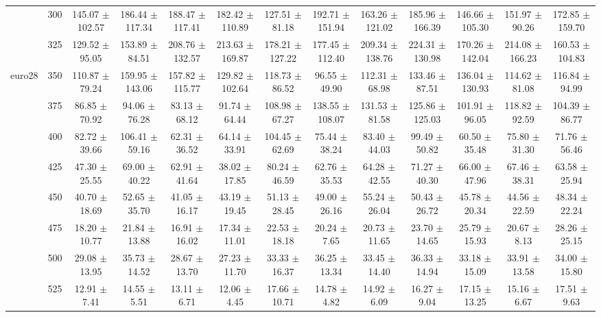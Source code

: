 \begin{table}[h]
{\begin{tabular}{
        ccccccccccccc}
 & 300& 145.07 $\pm$ 102.57& 186.44 $\pm$ 117.34& 188.47 $\pm$ 117.41& 182.42 $\pm$ 110.89& 127.51 $\pm$ 81.18& 192.71 $\pm$ 151.94& 163.26 $\pm$ 121.02& 185.96 $\pm$ 166.39& 146.66 $\pm$ 105.30& 151.97 $\pm$ 90.26& 172.85 $\pm$ 159.70 \\ 
 & 325& 129.52 $\pm$ 95.05& 153.89 $\pm$ 84.51& 208.76 $\pm$ 132.57& 213.63 $\pm$ 169.87& 178.21 $\pm$ 127.22& 177.45 $\pm$ 112.40& 209.34 $\pm$ 138.76& 224.31 $\pm$ 130.98& 170.26 $\pm$ 142.04& 214.08 $\pm$ 166.23& 160.53 $\pm$ 104.83 \\ 
\multirow{4}{*}{euro28}& 350& 110.87 $\pm$ 79.24& 159.95 $\pm$ 143.06& 157.82 $\pm$ 115.77& 129.82 $\pm$ 102.64& 118.73 $\pm$ 86.52& 96.55 $\pm$ 49.90& 112.31 $\pm$ 68.98& 133.46 $\pm$ 87.51& 136.04 $\pm$ 130.93& 114.62 $\pm$ 81.08& 116.84 $\pm$ 94.99 \\ 
 & 375& 86.85 $\pm$ 70.92& 94.06 $\pm$ 76.28& 83.13 $\pm$ 68.12& 91.74 $\pm$ 64.44& 108.98 $\pm$ 67.27& 138.55 $\pm$ 108.07& 131.53 $\pm$ 81.58& 125.86 $\pm$ 125.03& 101.91 $\pm$ 96.05& 118.82 $\pm$ 92.59& 104.39 $\pm$ 86.77 \\ 
 & 400& 82.72 $\pm$ 39.66& 106.41 $\pm$ 59.16& 62.31 $\pm$ 36.52& 64.14 $\pm$ 33.91& 104.45 $\pm$ 62.69& 75.44 $\pm$ 38.24& 83.40 $\pm$ 44.03& 99.49 $\pm$ 50.82& 60.50 $\pm$ 35.48& 75.80 $\pm$ 31.30& 71.76 $\pm$ 56.46 \\ 
 & 425& 47.30 $\pm$ 25.55& 69.00 $\pm$ 40.22& 62.91 $\pm$ 41.64& 38.02 $\pm$ 17.85& 80.24 $\pm$ 46.59& 62.76 $\pm$ 35.53& 64.28 $\pm$ 42.55& 71.27 $\pm$ 40.30& 66.00 $\pm$ 47.96& 67.46 $\pm$ 38.31& 63.58 $\pm$ 25.94 \\ 
 & 450& 40.70 $\pm$ 18.69& 52.65 $\pm$ 35.70& 41.05 $\pm$ 16.17& 43.19 $\pm$ 19.45& 51.13 $\pm$ 28.45& 49.00 $\pm$ 26.16& 55.24 $\pm$ 26.04& 50.43 $\pm$ 26.72& 45.78 $\pm$ 20.34& 44.56 $\pm$ 22.59& 48.34 $\pm$ 22.24 \\ 
 & 475& 18.20 $\pm$ 10.77& 21.84 $\pm$ 13.88& 16.91 $\pm$ 16.02& 17.34 $\pm$ 11.01& 22.53 $\pm$ 18.18& 20.24 $\pm$ 7.65& 20.73 $\pm$ 11.65& 23.70 $\pm$ 14.65& 25.79 $\pm$ 15.93& 20.67 $\pm$ 8.13& 28.26 $\pm$ 25.15 \\ 
 & 500& 29.08 $\pm$ 13.95& 35.73 $\pm$ 14.52& 28.67 $\pm$ 13.70& 27.23 $\pm$ 11.70& 33.33 $\pm$ 16.37& 36.25 $\pm$ 13.34& 33.45 $\pm$ 14.40& 36.33 $\pm$ 14.94& 33.18 $\pm$ 15.09& 33.91 $\pm$ 13.58& 34.00 $\pm$ 15.80 \\ 
 & 525& 12.91 $\pm$ 7.41& 14.55 $\pm$ 5.51& 13.11 $\pm$ 6.71& 12.06 $\pm$ 4.45& 17.66 $\pm$ 10.71& 14.78 $\pm$ 4.82& 14.92 $\pm$ 6.09& 16.27 $\pm$ 9.04& 17.15 $\pm$ 13.25& 15.16 $\pm$ 6.67& 17.51 $\pm$ 9.63 \\ 

\end{tabular}}
\end{table}
